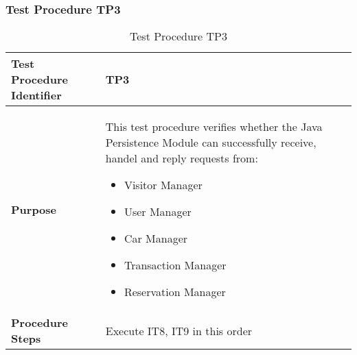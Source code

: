 \subsubsection{Test Procedure TP3} \label{sssec:TP3}
\vspace{10pt}
\begin{table}[htbp]
\begin{center}
\renewcommand{\arraystretch}{1.5}
\begin{tabular}{l|p{}}
\hline
\textbf{Test Procedure Identifier} & TP3\\
\hline
\textbf{Purpose} &  \begin{minipage}[t]{0.6\textwidth}
This test procedure verifies whether the Java Persistence Module can successfully receive, handel and reply requests from:
\begin{itemize}
\addtolength{\itemindent}{0.5cm}
\item Visitor Manager
\item User Manager
\item Car Manager
\item Transaction Manager
\item Reservation Manager
\vspace{2,5mm}
\end{itemize}
\end{minipage} \\
\hline
\textbf{Procedure Steps} & Execute IT8, IT9 in this order \\
\hline
\end{tabular}
\caption{Test Procedure TP3}
\end{center}
\end{table}
\clearpage

